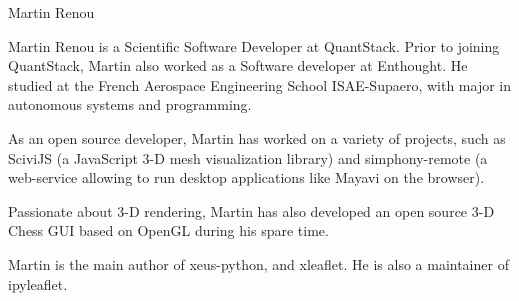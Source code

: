 \begin{participant}[type=R,PM=0,gender=male]{Martin Renou}

  Martin Renou is a Scientific Software Developer at QuantStack. Prior to joining QuantStack, Martin also worked as a Software developer at Enthought. He studied at the French Aerospace Engineering School ISAE-Supaero, with major in autonomous systems and programming.

  As an open source developer, Martin has worked on a variety of projects, such as SciviJS (a JavaScript 3-D mesh visualization library) and simphony-remote (a web-service allowing to run desktop applications like Mayavi on the browser).

  Passionate about 3-D rendering, Martin has also developed an open source 3-D Chess GUI based on OpenGL during his spare time.

  Martin is the main author of xeus-python, and xleaflet. He is also a maintainer of ipyleaflet.
\end{participant}

